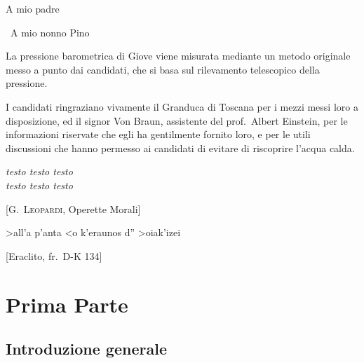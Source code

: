 	{\tomo
		\paginavuota
		\begin{dedica}
			A mio padre
			
			\textdagger\ A mio nonno Pino
		\end{dedica}
	}{%
	\frontespizio
}

\sommario

La pressione barometrica di Giove viene misurata
mediante un metodo originale  messo a punto dai candidati, che si basa
sul rilevamento telescopico della pressione.


\ringraziamenti

I candidati ringraziano vivamente il Granduca di Toscana per i mezzi
messi loro a disposizione, ed il signor Von Braun, assistente del
prof.~Albert Einstein, per le informazioni riservate che egli ha
gentilmente fornito loro, e per le utili discussioni che hanno permesso
ai candidati di evitare di riscoprire l'acqua calda.

\tablespagetrue\figurespagetrue %
\indici

\ifclassica   
\begin{citazioni}
	\textit{testo testo testo\\testo testo testo}
	
	[\textsc{G.\ Leopardi}, Operette Morali]
	
	\textgreek{>all'a p'anta <o k'eraunos d'' >oiak'izei}
	
	[Eraclito, fr.\ D-K 134]
\end{citazioni}

\fi
\mainmatter

\part{Prima Parte}
\chapter{Introduzione generale}

